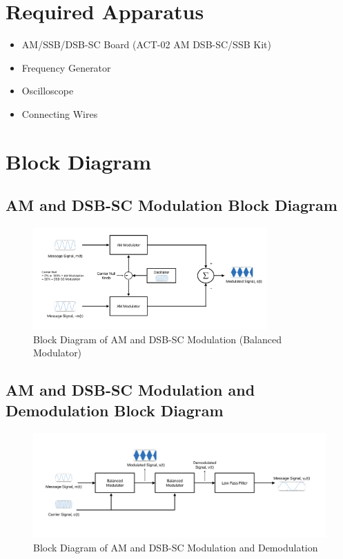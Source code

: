 \documentclass[12pt]{article}
\begin{document}
\section*{Required Apparatus}
\begin{itemize}
    \item AM/SSB/DSB-SC Board (ACT-02 AM DSB-SC/SSB Kit)
    \item Frequency Generator
    \item Oscilloscope
    \item Connecting Wires
\end{itemize}

\section*{Block Diagram}
\subsection*{AM and DSB-SC Modulation Block Diagram}
\begin{figure}[H]
    \centering
    \includegraphics[width=0.8\textwidth]{bm.png}
    \caption{Block Diagram of AM and DSB-SC Modulation (Balanced Modulator)}
    \label{fig:modulation_block_diagram}
\end{figure}

\subsection*{AM and DSB-SC Modulation and Demodulation Block Diagram}
\begin{figure}[H]
    \centering
    \includegraphics[width=\textwidth]{bmb.png}
    \caption{Block Diagram of AM and DSB-SC Modulation and Demodulation}
    \label{fig:modulation_demodulation_block_diagram}
\end{figure}
\end{document}
